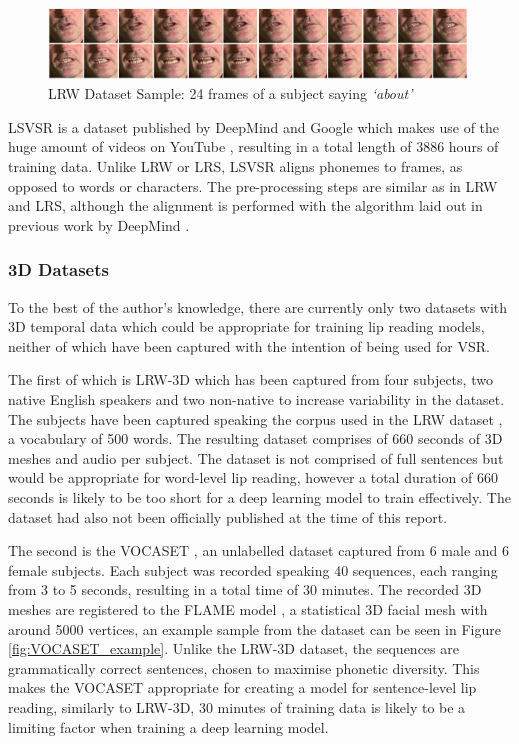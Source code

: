 \documentclass[12pt]{report}
\begin{document}
\begin{figure}[h]
    \centering
        \includegraphics[width=0.99\textwidth]{figures/lrw_one_second.png}
    \caption{LRW Dataset Sample: 24 frames of a subject saying \textit{`about'} \cite{Chung2016}}\label{fig:LRW_One_Second}
\end{figure}

LSVSR is a dataset published by DeepMind and Google which makes use of the huge amount of videos on YouTube \cite{Shillingford2018}, resulting in a total length of 3886 hours of training data.
Unlike LRW or LRS, LSVSR aligns phonemes to frames, as opposed to words or characters.
The pre-processing steps are similar as in LRW and LRS, although the alignment is performed with the algorithm laid out in previous work by DeepMind \cite{Liao2013}.

\subsubsection{3D Datasets} \label{3D Datasets}
To the best of the author's knowledge, there are currently only two datasets with 3D temporal data which could be appropriate for training lip reading models, neither of which have been captured with the intention of being used for VSR.

The first of which is LRW-3D \cite{Tzirakis2019} which has been captured from four subjects, two native English speakers and two non-native to increase variability in the dataset.
The subjects have been captured speaking the corpus used in the LRW dataset \cite{Chung2016}, a vocabulary of 500 words.
The resulting dataset comprises of 660 seconds of 3D meshes and audio per subject.
The dataset is not comprised of full sentences but would be appropriate for word-level lip reading, however a total duration of 660 seconds is likely to be too short for a deep learning model to train effectively.
The dataset had also not been officially published at the time of this report.

The second is the VOCASET \cite{Cudeiro2019}, an unlabelled dataset captured from 6 male and 6 female subjects.
Each subject was recorded speaking 40 sequences, each ranging from 3 to 5 seconds, resulting in a total time of 30 minutes.
The recorded 3D meshes are registered to the FLAME model \cite{Li2017}, a statistical 3D facial mesh with around 5000 vertices, an example sample from the dataset can be seen in Figure \ref{fig:VOCASET_example}.
Unlike the LRW-3D dataset, the sequences are grammatically correct sentences, chosen to maximise phonetic diversity.
This makes the VOCASET appropriate for creating a model for sentence-level lip reading, similarly to LRW-3D, 30 minutes of training data is likely to be a limiting factor when training a deep learning model.
\end{document}
